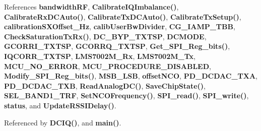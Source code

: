 References {\bf bandwidth\+RF}, {\bf Calibrate\+I\+Q\+Imbalance()}, {\bf Calibrate\+Rx\+D\+C\+Auto()}, {\bf Calibrate\+Tx\+D\+C\+Auto()}, {\bf Calibrate\+Tx\+Setup()}, {\bf calibration\+S\+X\+Offset\+\_\+\+Hz}, {\bf calib\+User\+Bw\+Divider}, {\bf C\+G\+\_\+\+I\+A\+M\+P\+\_\+\+T\+BB}, {\bf Check\+Saturation\+Tx\+Rx()}, {\bf D\+C\+\_\+\+B\+Y\+P\+\_\+\+T\+X\+T\+SP}, {\bf D\+C\+M\+O\+DE}, {\bf G\+C\+O\+R\+R\+I\+\_\+\+T\+X\+T\+SP}, {\bf G\+C\+O\+R\+R\+Q\+\_\+\+T\+X\+T\+SP}, {\bf Get\+\_\+\+S\+P\+I\+\_\+\+Reg\+\_\+bits()}, {\bf I\+Q\+C\+O\+R\+R\+\_\+\+T\+X\+T\+SP}, {\bf L\+M\+S7002\+M\+\_\+\+Rx}, {\bf L\+M\+S7002\+M\+\_\+\+Tx}, {\bf M\+C\+U\+\_\+\+N\+O\+\_\+\+E\+R\+R\+OR}, {\bf M\+C\+U\+\_\+\+P\+R\+O\+C\+E\+D\+U\+R\+E\+\_\+\+D\+I\+S\+A\+B\+L\+ED}, {\bf Modify\+\_\+\+S\+P\+I\+\_\+\+Reg\+\_\+bits()}, {\bf M\+S\+B\+\_\+\+L\+SB}, {\bf offset\+N\+CO}, {\bf P\+D\+\_\+\+D\+C\+D\+A\+C\+\_\+\+T\+XA}, {\bf P\+D\+\_\+\+D\+C\+D\+A\+C\+\_\+\+T\+XB}, {\bf Read\+Analog\+D\+C()}, {\bf Save\+Chip\+State()}, {\bf S\+E\+L\+\_\+\+B\+A\+N\+D1\+\_\+\+T\+RF}, {\bf Set\+N\+C\+O\+Frequency()}, {\bf S\+P\+I\+\_\+read()}, {\bf S\+P\+I\+\_\+write()}, {\bf status}, and {\bf Update\+R\+S\+S\+I\+Delay()}.



Referenced by {\bf D\+C\+I\+Q()}, and {\bf main()}.



